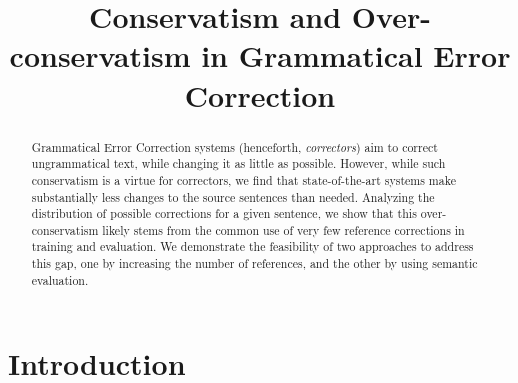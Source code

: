 \documentclass[letter,11pt]{article}
\begin{document}
	
\title{Conservatism and Over-conservatism in Grammatical Error Correction}



\maketitle

\begin{abstract}
  Grammatical Error Correction systems (henceforth, {\it correctors}) aim to correct ungrammatical text,
  while changing it as little as possible. However, while such conservatism is a virtue for correctors,
  we find that state-of-the-art systems make substantially less changes to the source sentences than needed.
  Analyzing the distribution of possible corrections for a given sentence,   
  we show that this over-conservatism likely stems from the common use of very few reference
  corrections in training and evaluation. We demonstrate the feasibility of two approaches to address this gap,
  one by increasing the number of references, and the other by using semantic evaluation.
\end{abstract}

\section{Introduction}
\end{document}
